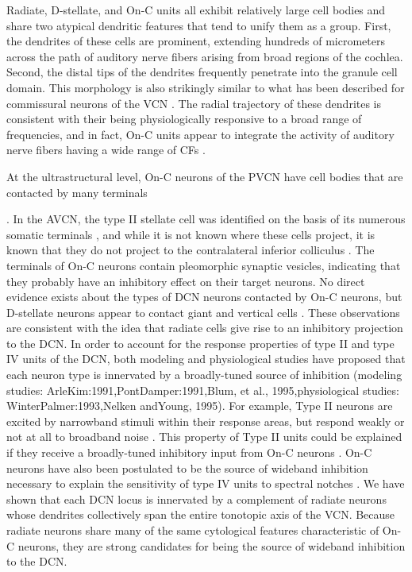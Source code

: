 \documentclass[10pt,a4paper]{article}
\begin{document}
Radiate, D-stellate, and On-C units all exhibit relatively large cell bodies and
share two atypical dendritic features that tend to unify them as a group. First,
the dendrites of these cells are prominent, extending hundreds of micrometers
across the path of auditory nerve fibers arising from broad regions of the
cochlea. Second, the distal tips of the dendrites frequently penetrate into the
granule cell domain. This morphology is also strikingly similar to what has been
described for commissural neurons of the VCN \citep{SchofieldCant:1996}. The
radial trajectory of these dendrites is consistent with their being
physiologically responsive to a broad range of frequencies, and in fact, On-C
units appear to integrate the activity of auditory nerve fibers having a wide
range of CFs
\citep{RhodeSmith:1986,WinterPalmer:1995,JiangPalmerEtAl:1996,PalmerWallaceEtAl:1996}.

At the ultrastructural level, On-C neurons of the PVCN have cell bodies that are
contacted by many terminals

\citep{SmithRhode:1989}. In the AVCN, the type II stellate cell was identified
on the basis of its numerous somatic terminals \citep{Cant:1981}, and while it
is not known where these cells project, it is known that they do not project to
the contralateral inferior colliculus \citep{Cant:1982}. The terminals of On-C
neurons contain pleomorphic synaptic vesicles, indicating that they probably
have an inhibitory effect on their target neurons. No direct evidence exists
about the types of DCN neurons contacted by On-C neurons, but D-stellate neurons
appear to contact giant and vertical cells \citep{ZhangOertel:1993a,b}. These
observations are consistent with the idea that radiate cells give rise to an
inhibitory projection to the DCN. In order to account for the response
properties of type II and type IV units of the DCN, both modeling and
physiological studies have proposed that each neuron type is innervated by a
broadly-tuned source of inhibition (modeling studies:
ArleKim:1991,PontDamper:1991,Blum, et al., 1995,physiological studies:
WinterPalmer:1993,Nelken andYoung, 1995).  For example, Type II neurons are
excited by narrowband stimuli within their response areas, but respond weakly or
not at all to broadband noise \citep{YoungBrownell:1976}. This property of Type
II units could be explained if they receive a broadly-tuned inhibitory input
from On-C neurons \citep{WinterPalmer:1993}. On-C neurons have also been
postulated to be the source of wideband inhibition necessary to explain the
sensitivity of type IV units to spectral notches \citep{NelkenYoung:1995}. We
have shown that each DCN locus is innervated by a complement of radiate neurons
whose dendrites collectively span the entire tonotopic axis of the VCN. Because
radiate neurons share many of the same cytological features characteristic of
On-C neurons, they are strong candidates for being the source of wideband
inhibition to the DCN.
\end{document}
